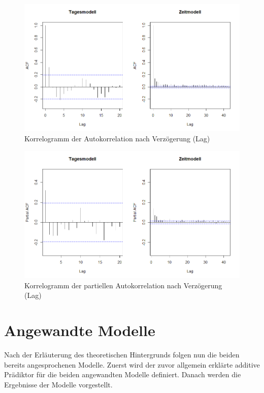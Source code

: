 \documentclass[12pt]{scrreprt}
\begin{document}
\begin{figure}[H]
	\vspace{-1cm}
	\centering
	\includegraphics[width=\linewidth]{plots/ACF}
	\caption{Korrelogramm der Autokorrelation nach Verzögerung (Lag)}
	\label{pic:ACF}	
\end{figure}

\begin{figure}[H]
	\centering
	\vspace{-1cm}
	\includegraphics[width=\linewidth]{plots/PACF}
	\caption{Korrelogramm der partiellen Autokorrelation nach Verzögerung (Lag)}
	\label{pic:PACF}	
\end{figure}


\chapter{Angewandte Modelle}
\label{chap:modelle}
\vspace{-0.5cm}
Nach der Erläuterung des theoretischen Hintergrunds folgen nun die beiden bereits angesprochenen Modelle. Zuerst wird der zuvor allgemein erklärte additive Prädiktor für die beiden angewandten Modelle definiert. Danach werden die Ergebnisse der Modelle vorgestellt.
\end{document}
